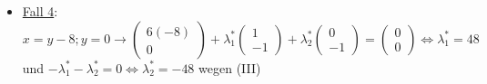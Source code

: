 \begin{enumerate}
\begin{itemize}
                \item \underline{Fall 4}: \(x=y-8; y=0 \rightarrow \begin{pmatrix}
                    6(-8)\\0
                    \end{pmatrix} + \lambda_1^* \begin{pmatrix}
                        1\\-1
                    \end{pmatrix} + \lambda_2^* \begin{pmatrix}
                        0\\-1
                    \end{pmatrix}
                     = \begin{pmatrix}
                        0\\0
                    \end{pmatrix}\Leftrightarrow \lambda_1^*=48\) und \(-\lambda_1^* - \lambda_2^* = 0 \Leftrightarrow \lambda_2^*=-48\) \Lightning \hspace{0.1em} wegen (III)
    

        \end{itemize} 
\end{enumerate}